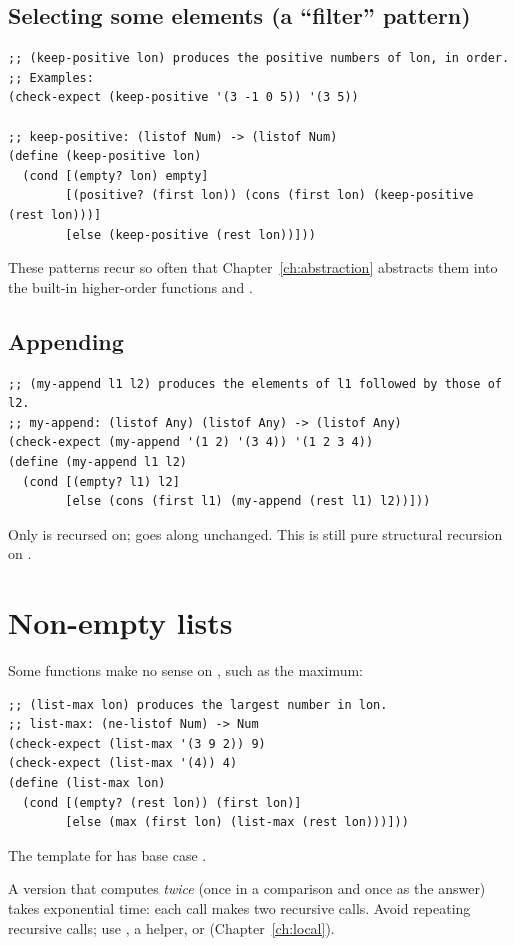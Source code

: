 \subsection{Selecting some elements (a ``filter'' pattern)}
\begin{lstlisting}[style=racket]
;; (keep-positive lon) produces the positive numbers of lon, in order.
;; Examples:
(check-expect (keep-positive '(3 -1 0 5)) '(3 5))

;; keep-positive: (listof Num) -> (listof Num)
(define (keep-positive lon)
  (cond [(empty? lon) empty]
        [(positive? (first lon)) (cons (first lon) (keep-positive (rest lon)))]
        [else (keep-positive (rest lon))]))
\end{lstlisting}

These patterns recur so often that Chapter~\ref{ch:abstraction} abstracts them
into the built-in higher-order functions  and .

\subsection{Appending}
\begin{lstlisting}[style=racket]
;; (my-append l1 l2) produces the elements of l1 followed by those of l2.
;; my-append: (listof Any) (listof Any) -> (listof Any)
(check-expect (my-append '(1 2) '(3 4)) '(1 2 3 4))
(define (my-append l1 l2)
  (cond [(empty? l1) l2]
        [else (cons (first l1) (my-append (rest l1) l2))]))
\end{lstlisting}
Only  is recursed on;  goes along unchanged. This is still
pure structural recursion on .

\section{Non-empty lists}
Some functions make no sense on , such as the maximum:
\begin{lstlisting}[style=racket]
;; (list-max lon) produces the largest number in lon.
;; list-max: (ne-listof Num) -> Num
(check-expect (list-max '(3 9 2)) 9)
(check-expect (list-max '(4)) 4)
(define (list-max lon)
  (cond [(empty? (rest lon)) (first lon)]
        [else (max (first lon) (list-max (rest lon)))]))
\end{lstlisting}
The template for  has base case .

\begin{aside}
A version that computes  \emph{twice} (once in a
comparison and once as the answer) takes exponential time: each call makes two
recursive calls. Avoid repeating recursive calls; use , a helper, or
 (Chapter~\ref{ch:local}).
\end{aside}

